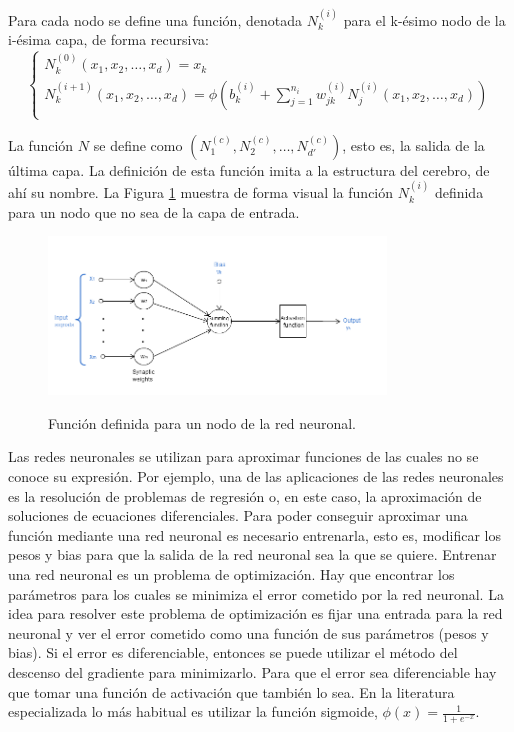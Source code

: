 \documentclass{article}
\theoremstyle{theorem-style}  %
\theoremstyle{definition-style}
\theoremstyle{example-style}
\begin{document}
	 Para cada nodo se define una función, denotada $N_k^{(i)}$ para el k-ésimo nodo de la i-ésima capa, de forma recursiva:
	\begin{equation}
		\begin{cases}
			N_k^{(0)}(x_1, x_2, \ldots, x_d) = x_k \\
			N_k^{(i+1)}(x_1, x_2, \ldots, x_d) = \phi(b_k^{(i)} + \sum_{j = 1}^{n_i} w_{jk}^{(i)} N_j^{(i)}(x_1, x_2, \ldots, x_d))  \\
		\end{cases}
	\end{equation}
	
	La función $N$ se define como $(N_1^{(c)}, N_2^{(c)},\ldots, N_{d'}^{(c)})$, esto es, la salida de la última capa. La definición de esta función imita a la estructura del cerebro, de ahí su nombre. La Figura \ref{fig:neuron} muestra de forma visual la función $N_k^{(i)}$ definida para un nodo que no sea de la capa de entrada.
	
	\begin{figure}[H]
		\centering
		\includegraphics[width=0.8\textwidth]{./Images/red.png}
		\label{fig:neuron}
		\caption{Función definida para un nodo de la red neuronal.}
	\end{figure}
	
	Las redes neuronales se utilizan para aproximar funciones de las cuales no se conoce su expresión. Por ejemplo, una de las aplicaciones de las redes neuronales es la resolución de problemas de regresión o, en este caso, la aproximación de soluciones de ecuaciones diferenciales. Para poder conseguir aproximar una función mediante una red neuronal es necesario entrenarla, esto es, modificar los pesos y bias para que la salida de la red neuronal sea la que se quiere. Entrenar una red neuronal es un problema de optimización. Hay que encontrar los parámetros para los cuales se minimiza el error cometido por la red neuronal. La idea para resolver este problema de optimización es fijar una entrada para la red neuronal y ver el error cometido como una función de sus parámetros (pesos y bias). Si el error es diferenciable, entonces se puede utilizar el método del descenso del gradiente para minimizarlo. Para que el error sea diferenciable hay que tomar una función de activación que también lo sea. En la literatura especializada lo más habitual es utilizar la función sigmoide, $\phi(x) = \frac{1}{1 + e^{-x}}$.
	
\end{document}
